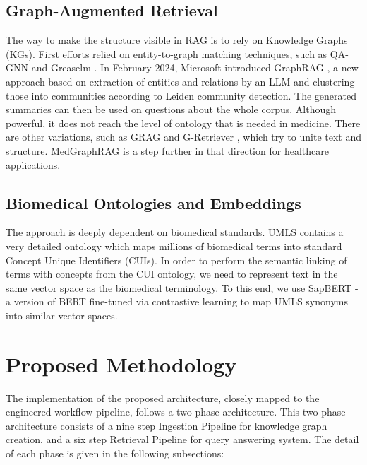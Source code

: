 \documentclass[a4paper,fleqn]{cas-sc}
\begin{document}
\subsection{Graph-Augmented Retrieval}
The way to make the structure visible in RAG is to rely on Knowledge Graphs (KGs). First efforts relied on entity-to-graph matching techniques, such as QA-GNN \cite{yasunaga2021qagnn} and Greaselm \cite{zhang2022greaselm}. In February 2024, Microsoft introduced GraphRAG \cite{edge2024graphrag}, a new approach based on extraction of entities and relations by an LLM and clustering those into communities according to Leiden community detection. The generated summaries can then be used on questions about the whole corpus. Although powerful, it does not reach the level of ontology that is needed in medicine. There are other variations, such as GRAG \cite{hu2024grag} and G-Retriever \cite{he2024gretriever}, which try to unite text and structure. MedGraphRAG \cite{wu2024medgraphrag} is a step further in that direction for healthcare applications.

\subsection{Biomedical Ontologies and Embeddings}
The approach is deeply dependent on biomedical standards. UMLS \cite{bodenreider2004umls} contains a very detailed ontology which maps millions of biomedical terms into standard Concept Unique Identifiers (CUIs). In order to perform the semantic linking of terms with concepts from the CUI ontology, we need to represent text in the same vector space as the biomedical terminology. To this end, we use SapBERT \cite{liu2021sapbert} - a version of BERT fine-tuned via contrastive learning to map UMLS synonyms into similar vector spaces.

\section{Proposed Methodology}

The implementation of the proposed architecture, closely mapped to the engineered workflow pipeline, follows a two-phase architecture. This two phase architecture consists of a nine step Ingestion Pipeline for knowledge graph creation, and a six step Retrieval Pipeline for query answering system. The detail of each phase is given in the following subsections:
\end{document}
